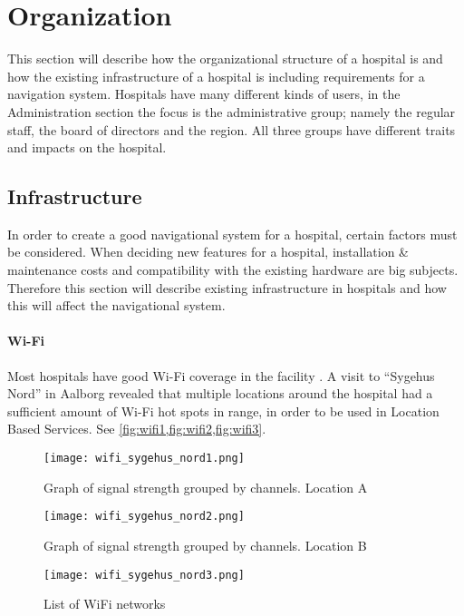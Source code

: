 \section{Organization} %
\label{sec:organization}

This section will describe how the organizational structure of a hospital is and how the existing infrastructure of a hospital is including requirements for a navigation system. Hospitals have many different kinds of users, in the Administration section the focus is the administrative group; namely the regular staff, the board of directors and the region. All three groups have different traits and impacts on the hospital.



\subsection{Infrastructure}

In order to create a good navigational system for a hospital, certain factors must be considered. When deciding new features for a hospital, installation \& maintenance costs and compatibility with the existing hardware are big subjects. Therefore this section will describe existing infrastructure in hospitals and how this will affect the navigational system.

\paragraph{Wi-Fi} \label{orgwifi}

Most hospitals have good Wi-Fi coverage in the facility \cite{Millionkontrakt_giver_Ca}. A visit to \enquote{Sygehus Nord} in Aalborg revealed that multiple locations around the hospital had a sufficient amount of Wi-Fi hot spots in range, in order to be used in Location Based Services. See \cref{fig:wifi1,fig:wifi2,fig:wifi3}.

\begin{figure}
\centering
  \begin{minipage}{0.45\textwidth}
    \centering
    \texttt{[image: wifi\_sygehus\_nord1.png]}
    \caption{Graph of signal strength grouped by channels. Location A} \label{fig:wifi1}
  \end{minipage}
  \hfill
  \begin{minipage}{0.45\textwidth}
    \centering
    \texttt{[image: wifi\_sygehus\_nord2.png]}
    \caption{Graph of signal strength grouped by channels. Location B} \label{fig:wifi2}
  \end{minipage}
    \begin{minipage}{0.45\textwidth}
    \centering
    \texttt{[image: wifi\_sygehus\_nord3.png]}
    \caption{List of WiFi networks} \label{fig:wifi3}
  \end{minipage}
  \end{figure}


